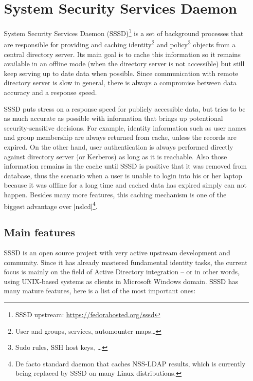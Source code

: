 \chapter{System Security Services Daemon}
\label{chapter:sssd}

System Security Services Daemon (SSSD)\footnote{SSSD upstream:
\url{https://fedorahosted.org/sssd}} is a set of background processes that
are responsible for providing and caching identity\footnote{User and groups,
services, automounter maps\ldots}
and policy\footnote{Sudo rules, SSH host keys, \ldots} objects from a central
directory server. Its main goal is to cache this information so it remains
available in an offline mode (when the directory server is not accessible) but
still keep serving up to date data when possible. Since communication with
remote directory server is slow in general, there is always a compromise between
data accuracy and a response speed.

SSSD puts stress on a response speed for publicly accessible data, but tries to
be as much accurate as possible with information that brings up potentional
security-sensitive decisions. For example, identity information such as user
names and group membership are always returned from cache, unless the records
are expired. On the other hand, user authentication is always performed directly
against directory server (or Kerberos) as long as it is reachable. Also those
information remains in the cache until SSSD is positive that it was removed from
database, thus the scenario when a user is unable to login into his or her
laptop because it was offline for a long time and cached data has expired simply
can not happen. Besides many more features, this caching mechanism is one of the
biggest advantage over |nslcd|\footnote{De facto standard daemon that caches
NSS-LDAP results, which is currently being replaced by SSSD on many Linux
distributions.}.

\section{Main features}
\label{sssd:main-features}

SSSD is an open source project with very active upstream development and
community. Since it has already mastered fundamental identity tasks, the current
focus is mainly on the field of Active Directory integration -- or in other
words, using UNIX-based systems as clients in Microsoft Windows domain. SSSD
has many mature features, here is a list of the most important ones:

